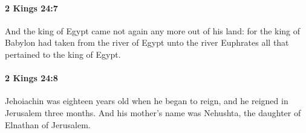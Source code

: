 		\paragraph{2 Kings 24:7} %
			\label{2KINGS-24-7}

			And the king of Egypt came not again any more out of his land: for the king of Babylon had taken from the river of Egypt unto the river Euphrates all that pertained to the king of Egypt.


		\paragraph{2 Kings 24:8} %
			\label{2KINGS-24-8}

			Jehoiachin was eighteen years old when he began to reign, and he reigned in Jerusalem three months. And his mother’s name was Nehushta, the daughter of Elnathan of Jerusalem.


